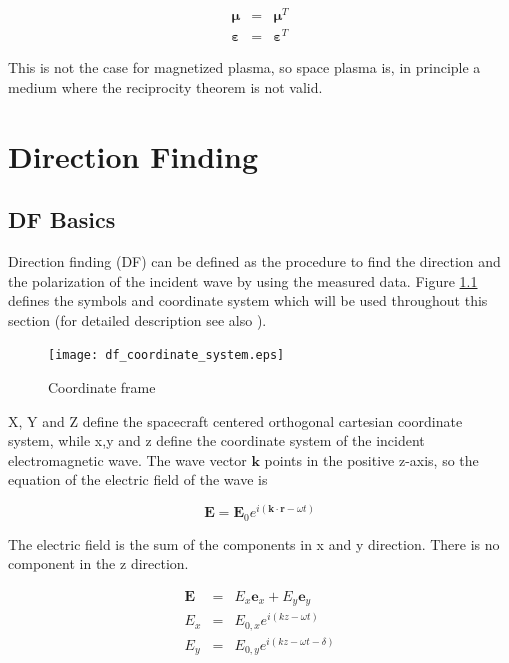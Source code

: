 \documentclass[a4paper,14pt]{extbook}
\begin{document}
\begin{eqnarray}
\mathbf{\mu} &=& \mathbf{\mu}^T \label{reciproci_tensor_1} \\
\mathbf{\varepsilon} &=& \mathbf{\varepsilon}^T \label{reciproci_tensor_2}
\end{eqnarray}

This is not the case for magnetized plasma, so space plasma is, in principle a medium where the reciprocity theorem is not valid.

\chapter{Direction Finding}
\section{DF Basics}
Direction finding (DF) can be defined as the procedure to find the direction and the polarization of the incident wave by using the measured data. Figure \ref{fig_coordinate_frame_DF} defines the symbols and coordinate system which will be used throughout this section (for detailed description see also
\cite{ladreiter_03}).\\

\begin{figure}
  \texttt{[image: df\_coordinate\_system.eps]}\\
  \caption{Coordinate frame}\label{fig_coordinate_frame_DF}
\end{figure}


X, Y and Z define the spacecraft centered orthogonal cartesian coordinate system, while x,y and z define the coordinate system of the incident electromagnetic wave. The wave vector $\textbf{k}$ points in the positive z-axis, so the equation of the electric field of the wave is

\begin{equation}
\textbf{E}=\textbf{E}_0 e^{i(\textbf{k} \cdot \textbf{r} - \omega t)}
\end{equation}


The electric field is the sum of the components in x and y direction. There is no component in the z direction.

\begin{eqnarray}
\textbf{E}&=&E_x\textbf{e}_x + E_y\textbf{e}_y\\
E_x&=&E_{0,x} e^{i(kz - \omega t)} \label{Ex} \\
E_y&=&E_{0,y} e^{i(kz - \omega t - \delta)} \label{Ey}
\end{eqnarray}
\end{document}
